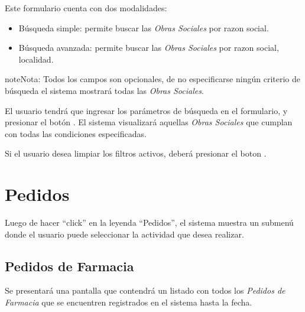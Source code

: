 \documentclass[a4paper,10pt,spanish]{sphinxmanual}
\begin{document}

Este formulario cuenta con dos modalidades:
\begin{itemize}
\item {} 
Búsqueda simple: permite buscar las \emph{Obras Sociales} por razon social.

\item {} 
Búsqueda avanzada: permite buscar las \emph{Obras Sociales} por razon social, localidad.

\end{itemize}

\begin{notice}{note}{Nota:}
Todos los campos son opcionales, de no especificarse ningún criterio de búsqueda el sistema mostrará todas las \emph{Obras Sociales}.
\end{notice}

El usuario tendrá que ingresar los parámetros de búsqueda en el formulario, y presionar el botón . El sistema visualizará aquellas \emph{Obras Sociales} que cumplan con todas las condiciones especificadas.

Si el usuario desea limpiar los filtros activos, deberá presionar el boton .



\chapter{Pedidos}
\label{pedidos::doc}\label{pedidos:pedidos}
Luego de hacer “click” en  la leyenda “Pedidos”, el sistema muestra un submenú donde el usuario puede seleccionar la actividad que desea realizar.


\section{Pedidos de Farmacia}
\label{pedidosfarmacia::doc}\label{pedidosfarmacia:pedidos-de-farmacia}
Se presentará una pantalla que contendrá un listado con todos los \emph{Pedidos de Farmacia} que se encuentren registrados en el sistema hasta la fecha.

\end{document}

